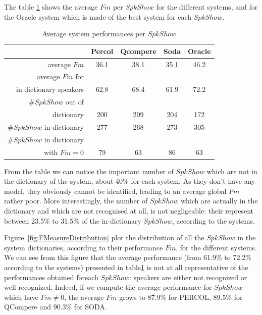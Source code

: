 

The table \ref{table-spkshow-perf} shows the average $Fm$ per $SpkShow$ for the different systems, and for the Oracle system which is made of the best system for each $SpkShow$.
\begin{table}[t]
\begin{center}
\begin{tabular}{r||c|c|c|c}
& Percol & Qcompere & Soda & Oracle \\\hline\hline
average $Fm$ & 36.1 & 38.1 & 35.1 & 46.2\\\hline
average $Fm$ for & & & &\\
in dictionary speakers & 62.8 & 68.4 & 61.9 & 72.2\\\hline
\#$SpkShow$ out of & & & &\\
dictionary & 200 & 209 & 204 & 172\\\hline
\#$SpkShow$ in dictionary & 277& 268 & 273 & 305\\\hline
\#$SpkShow$ in dictionary& & & & \\
with $Fm=0$ & 79 & 63 & 86 & 63\\\hline
\end{tabular}
\caption{Average system performances per $SpkShow$}
\label{table-spkshow-perf}
\end{center}
\end{table}

From the table we can notice the important number of $SpkShow$ which are not in the dictionary of the system, about 40\% for each system. As they don't have any model, they obviously cannot be identified, leading to an average global $Fm$ rather poor. More interestingly, the number of $SpkShow$ which are actually in the dictionary and which are not recognised at all, is not negligeable: their represent between 23.5\% to 31.5\% of the in-dictionary $SpkShow$, according to the systems.


Figure~\ref{fig:FMeasureDistribution} plot the distribution of all the $SpkShow$ in the system dictionaries, according to their performance $Fm$, for the different systems. We can see from this figure that the average performance (from 61.9\% to 72.2\% according to the systems) presented in table\ref{table-spkshow-perf} is not at all representative of the performances obtained foreach $SpkShow$: speakers are either not recognized or well recognized. Indeed, if we compute the average performance for $SpkShow$ which have $Fm \neq 0$, the average $Fm$ grows to 87.9\% for PERCOL, 89.5\% for QCompere and 90.3\% for SODA. 

